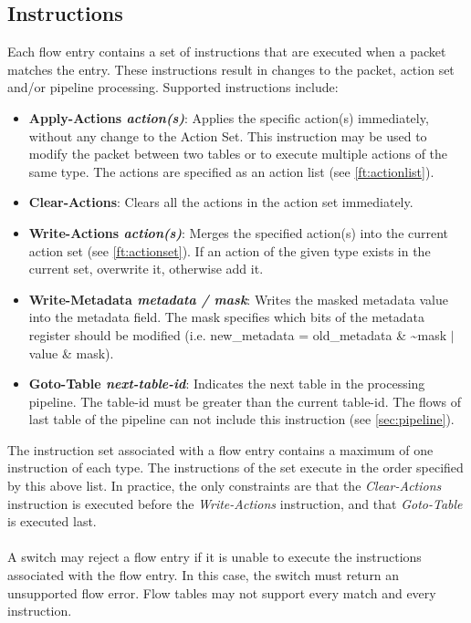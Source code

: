 \documentclass[10pt]{article}
\begin{document}
\subsection{Instructions}
\label{ft:instructions}
Each flow entry contains a set of instructions that are executed when a packet matches the entry. These instructions result in changes to the packet, action set and/or pipeline processing. Supported instructions include:
\begin{itemize}
\item \textbf{Apply-Actions \textit{action(s)}}: Applies the specific action(s) immediately, without any change to the Action Set. This instruction may be used to modify the packet between two tables or to execute multiple actions of the same type. The actions are specified as an action list (see \ref{ft:actionlist}).
\item \textbf{Clear-Actions}: Clears all the actions in the action set immediately.
\item \textbf{Write-Actions \textit{action(s)}}: Merges the specified action(s) into the current action set (see \ref{ft:actionset}).  If an action of the given type exists in the current set, overwrite it, otherwise add it.
\item \textbf{Write-Metadata \textit{metadata / mask}}: Writes the masked metadata value into the metadata field. The mask specifies which bits of the metadata register should be modified (i.e. new\_metadata = old\_metadata \& \~{}mask $|$ value \& mask).
\item \textbf{Goto-Table \textit{next-table-id}}: Indicates the next table in the processing pipeline. The table-id must be greater than the current table-id. The flows of last table of the pipeline can not include this instruction (see \ref{sec:pipeline}).
\end{itemize} 

The instruction set associated with a flow entry contains a maximum of one instruction of each type. The instructions of the set execute in the order specified by this above list.  In practice, the only constraints are that the \emph{Clear-Actions} instruction is executed before the \emph{Write-Actions} instruction, and that \emph{Goto-Table} is executed last.
\\\\
A switch may reject a flow entry if it is unable to execute the instructions associated with the flow entry. In this case, the switch must return an unsupported flow error.  Flow tables may not support every match and every instruction.
\end{document}
